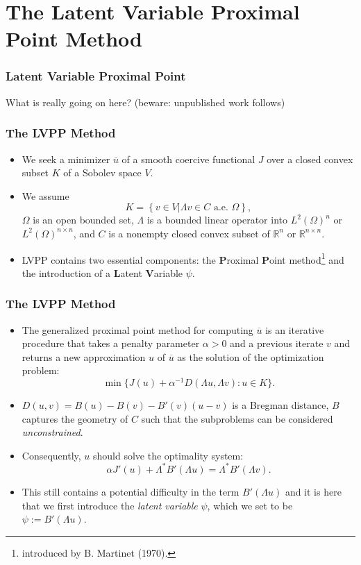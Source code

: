 \documentclass[aspectratio=169,xcolor=dvipsnames,11pt]{beamer}
\begin{document}
\section{The Latent Variable Proximal Point Method}
\begin{frame}\frametitle{Latent Variable Proximal Point}
{\Large
{\color{Maroon}
What is really going on here? (beware: unpublished work follows)
}
}
\end{frame}

\begin{frame}\frametitle{The LVPP Method}
\begin{itemize}
\item We seek a minimizer $\overline{u}$ of a smooth coercive functional $J$ over a closed convex subset $K$ of a Sobolev space $V$. \pause
\item  We assume 
\[
K = \left\{v \in V \left| \Lambda v \in C \text{ a.e. } \Omega \right.\right\},
\] 
$\Omega$ is an open bounded set, $\Lambda$ is a bounded linear operator into $L^2(\Omega)^n$ or $L^2(\Omega)^{n\times n}$, and $C$ is a nonempty closed convex subset of $\mathbb R^n$ or $\mathbb R^{n \times n}$. \pause
\item  LVPP contains two essential components: the \textbf{P}roximal \textbf{P}oint method\footnote{\tiny introduced by B. Martinet (1970).} and the introduction of a \textbf{L}atent \textbf{V}ariable $\psi$.
\end{itemize}
\end{frame}

\begin{frame}\frametitle{The LVPP Method}
\begin{itemize}
\item The generalized proximal point method for computing $\overline{u}$ is an iterative procedure that takes a penalty parameter $\alpha > 0$ and a previous iterate $v$ and returns a new approximation $u$ of $\overline{u}$  as the solution of the optimization problem: 
\[
\min\{ J(u) + \alpha^{-1} D(\Lambda u,\Lambda v) : u \in K\}.
\] 
\item \pause $D(u,v) = B(u) - B(v) - B'(v)(u - v)$ is a Bregman distance, $B$ captures the geometry of $C$ such that the subproblems can be considered \textit{unconstrained}.
\item \pause Consequently, $u$ should solve the optimality system:
\[
\alpha J'(u) + \Lambda^* B'(\Lambda u) = \Lambda^* B'(\Lambda v).
\]
\item \pause This still contains a potential difficulty in the term $B'(\Lambda u)$ and it is here that we first introduce the \textit{latent variable} $\psi$, which we set to be $\psi := B'(\Lambda u)$.  
\end{itemize}
\end{frame}
\end{document}
